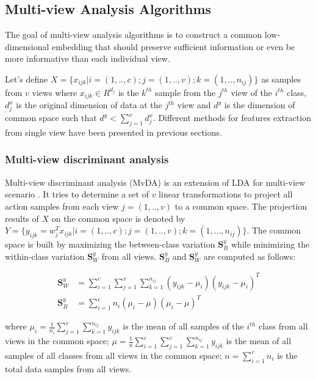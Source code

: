 
\subsection{Multi-view Analysis Algorithms}

    The goal of multi-view analysis algorithms is to construct a common low-dimensional embedding that should preserve sufficient information or even be more informative than each individual view.

    Let's define $X = \{x_{ijk}|i=(1,..,c);j = (1,..,v);k=(1,..,n_{ij})\}$ as samples from $v$ views where $x_{ijk} \in R^{d_j}$ is the $k^{th}$ sample from the $j^{th}$ view of the $i^{th}$ class, $d_j^x$ is the original dimension of data at the $j^{th}$ view and $d^y$ is the dimension of common space such that $d^y < \sum_{j=1}^{v}{d_j^x}$.
    Different methods for features extraction from single view have been presented in previous sections. 

    \subsubsection{Multi-view discriminant analysis}
        Multi-view discriminant analysis (MvDA) is an extension of LDA for multi-view scenario \cite{kan2015multi}.
        It tries to determine a set of $v$ linear transformations to project all action samples from each view $j = (1,..,v)$ to a common space.
        The projection results of $X$ on the common space is denoted by $Y = \{y_{ijk} = w_j^T x_{ijk}|i=(1,..,c); j=(1,..,v); k=(1,...,n_{ij})\}$.
        The common space is built by maximizing the between-class variation $\boldsymbol{S}_B^y$ while minimizing the within-class variation $\boldsymbol{S}_W^y$ from all views. $\boldsymbol{S}_B^y$ and $\boldsymbol{S}_W^y$ are computed as follows: 

        \begin{align}
            \boldsymbol{S}_W^y &= \sum_{i=1}^{c}\sum_{j=1}^{v}\sum_{k=1}^{n_{ij}}(y_{ijk}-\mu_i)(y_{ijk}-\mu_i)^T \label{eq:MvDA_Sw}\\
            \boldsymbol{S}_B^y &= \sum_{i=1}^{c}n_i(\mu_i - \mu)(\mu_i - \mu)^T \label{eq:MvDA_Sb}
        \end{align}

        where $\mu_i=\frac{1}{n_i}\sum_{j=1}^{v}{\sum_{k=1}^{n_{ij}}}{y_{ijk}}$ is the mean of all samples of the $i^{th}$ class from all views in the common space; $\mu=\frac{1}{n}\sum_{i=1}^{c}\sum_{j=1}^{v}{\sum_{k=1}^{n_{ij}}{y_{ijk}}}$ is the mean of all samples of all classes from all views in the common space; $n=\sum_{i=1}^{c}n_i$ is the total data samples from all views.

